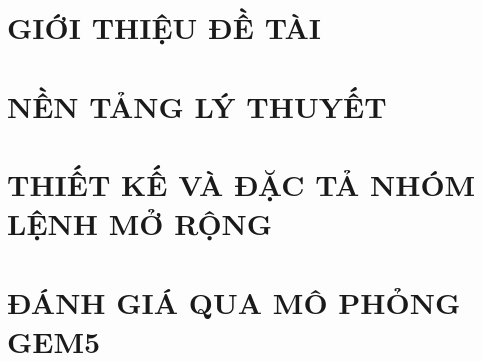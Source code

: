\documentclass[a4paper,twoside]{report}
\theoremstyle{definition}
\begin{document}
\renewcommand{\listtablename}{DANH MỤC BẢNG BIỂU}
{\let\oldnumberline\numberline
\renewcommand{\numberline}{Bảng~\oldnumberline}
\listoftables}

\glsaddall 
\renewcommand*{\acronymname}{DANH MỤC THUẬT NGỮ VÀ TỪ VIẾT TẮT}
\renewcommand*{\entryname}{Thuật ngữ}
\renewcommand*{\descriptionname}{Ý nghĩa}
\printnoidxglossary[type=\acronymtype]

\renewcommand\appendixname{PHỤ LỤC}
\renewcommand\appendixpagename{PHỤ LỤC}
\renewcommand\appendixtocname{PHỤ LỤC}





\newpage
\hypersetup{pageanchor=true}

\pagestyle{fancy}
\fancyhf{}
\renewcommand{\chaptermark}[1]{\markboth{CHƯƠNG \thechapter.\ #1}{}}
\fancyhead[RE, LO]{\leftmark}
\fancyfoot[RE, LO]{\thepage}

\chapter{GIỚI THIỆU ĐỀ TÀI}
\label{chap:gioi-thieu}

\newpage
\chapter{NỀN TẢNG LÝ THUYẾT}
\label{chap:co-so-ly-thuyet}



\newpage
\chapter{THIẾT KẾ VÀ ĐẶC TẢ NHÓM LỆNH MỞ RỘNG}
\label{chap:de-xuat}


\newpage
\chapter{ĐÁNH GIÁ QUA MÔ PHỎNG GEM5}
\label{chap:phan-tich-ly-thuyet}

\end{document}
